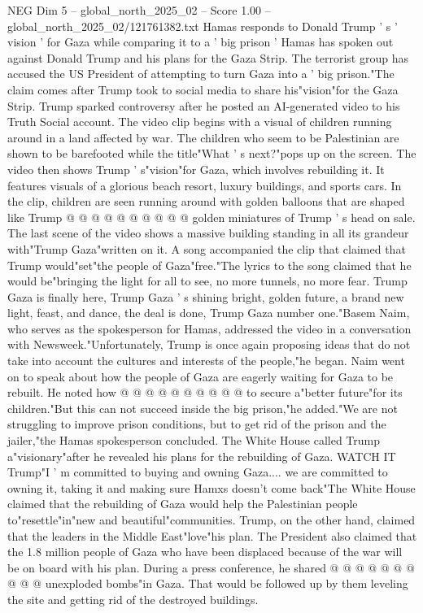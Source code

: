 \begin{textsample}{NEG Dim 5 – global\_north\_2025\_02 – Score 1.00 – global\_north\_2025\_02/121761382.txt}  \label{ex:f5_neg_250}
Hamas responds to Donald Trump ' s ' vision ' for Gaza while comparing it to a ' big prison ' Hamas has spoken out against Donald Trump and his plans for the Gaza Strip.
The terrorist group has accused the US President of attempting to turn Gaza into a ' big prison."The claim comes after Trump took to social media to share his"vision"for the Gaza Strip.
Trump sparked controversy after he posted an AI-generated video to his Truth Social account.
The video clip begins with a visual of children running around in a land affected by war.
The children who seem to be Palestinian are shown to be barefooted while the title"What ' s next?"pops up on the screen.
The video then shows Trump ' s"vision"for Gaza, which involves rebuilding it.
It features visuals of a glorious beach resort, luxury buildings, and sports cars.
In the clip, children are seen running around with golden balloons that are shaped like Trump @ @ @ @ @ @ @ @ @ @ golden miniatures of Trump ' s head on sale.
The last scene of the video shows a massive building standing in all its grandeur with"Trump Gaza"written on it.
A song accompanied the clip that claimed that Trump would"set"the people of Gaza"free."The lyrics to the song claimed that he would be"bringing the light for all to see, no more tunnels, no more fear.
Trump Gaza is finally here, Trump Gaza ' s shining bright, golden future, a brand new light, feast, and dance, the deal is done, Trump Gaza number one."Basem Naim, who serves as the spokesperson for Hamas, addressed the video in a conversation with Newsweek."Unfortunately, Trump is once again proposing ideas that do not take into account the cultures and interests of the people,"he began.
Naim went on to speak about how the people of Gaza are eagerly waiting for Gaza to be rebuilt.
He noted how @ @ @ @ @ @ @ @ @ @ to secure a"better future"for its children."But this can not succeed inside the big prison,"he added."We are not struggling to improve prison conditions, but to get rid of the prison and the jailer,"the Hamas spokesperson concluded.
The White House called Trump a"visionary"after he revealed his plans for the rebuilding of Gaza.
WATCH IT Trump"I ' m committed to buying and owning Gaza.... we are committed to owning it, taking it and making sure Hamxs doesn't come back"The White House claimed that the rebuilding of Gaza would help the Palestinian people to"resettle"in"new and beautiful"communities.
Trump, on the other hand, claimed that the leaders in the Middle East"love"his plan.
The President also claimed that the 1.8 million people of Gaza who have been displaced because of the war will be on board with his plan.
During a press conference, he shared @ @ @ @ @ @ @ @ @ @ unexploded bombs"in Gaza.
That would be followed up by them leveling the site and getting rid of the destroyed buildings.

\end{textsample}
